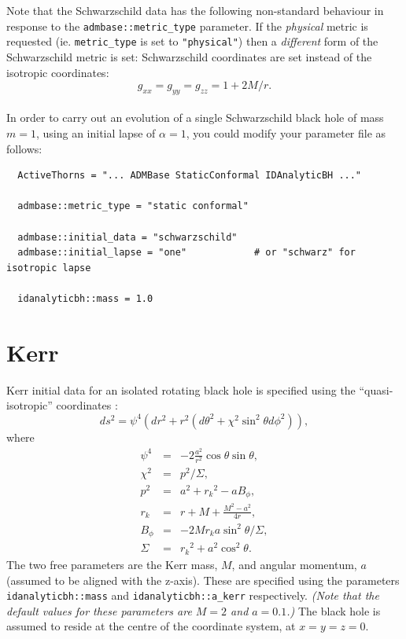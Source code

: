 \documentclass{article}
\begin{document}
Note that the Schwarzschild data has the following non-standard
behaviour in response to the \texttt{admbase::metric\_type}
parameter. If the \emph{physical} metric is requested
(ie. \texttt{metric\_type} is set to \texttt{"physical"}) then a
\emph{different} form of the Schwarzschild metric is set:
Schwarzschild coordinates are set instead of the isotropic
coordinates:
\begin{equation}
  g_{xx} = g_{yy} = g_{zz} = 1 + 2M/r.
\end{equation}\\


In order to carry out an evolution of a single Schwarzschild
black hole of mass $m=1$, using an initial lapse of $\alpha=1$, you
could modify your parameter file as follows:

\begin{verbatim}
  ActiveThorns = "... ADMBase StaticConformal IDAnalyticBH ..."

  admbase::metric_type = "static conformal"

  admbase::initial_data = "schwarzschild"
  admbase::initial_lapse = "one"            # or "schwarz" for isotropic lapse

  idanalyticbh::mass = 1.0
\end{verbatim}


\section{Kerr}

Kerr initial data for an isolated rotating black hole is specified
using the ``quasi-isotropic'' coordinates \cite{CactusEinstein_IDAnalyticBH_brandt-seidel:1996}:
\begin{equation}
  ds^2 = \psi^4 (dr^2 + r^2(d\theta^2 + \chi^2\sin^2\theta d\phi^2)),
\end{equation}
where
\begin{eqnarray}
  \psi^4 & = & - 2\frac{a^2}{r^2}\cos\theta\sin\theta, \\
  \chi^2 & = & p^2 / \Sigma, \\
  p^2 & = & a^2 + {r_k}^2 - a B_\phi, \\
  r_k & = & r + M + \frac{M^2 - a^2}{4r}, \\
  B_\phi & = & -2 M r_k a \sin^2\theta / \Sigma,\\
  \Sigma & = & {r_k}^2 + a^2 \cos^2\theta.
\end{eqnarray}
The two free parameters are the Kerr mass, $M$, and angular momentum,
$a$ (assumed to be aligned with the z-axis).
These are specified using the parameters
\texttt{idanalyticbh::mass} and \texttt{idanalyticbh::a\_kerr}
respectively. \emph{(Note that the default values for these parameters
are $M=2$ and $a=0.1$.)} The black hole is assumed to reside at the
centre of the coordinate system, at $x=y=z=0$.
\end{document}
